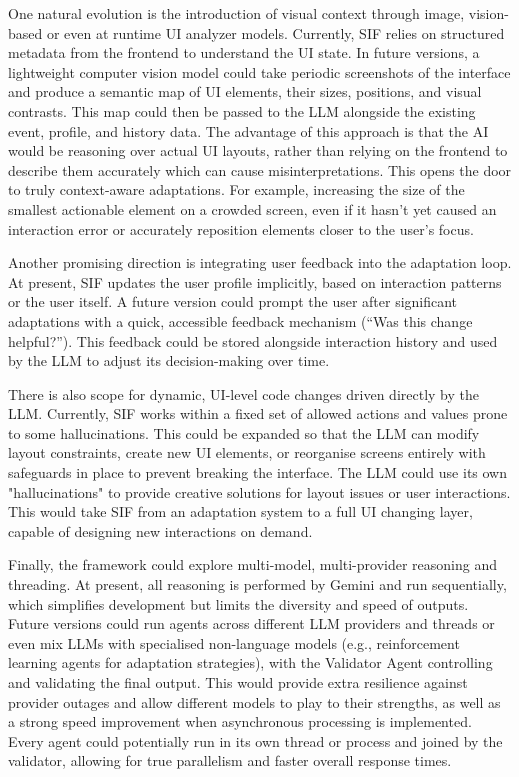 \documentclass[openany]{book}
\begin{document}
One natural evolution is the introduction of visual context through image, vision-based or even at runtime UI analyzer models. Currently, SIF relies on structured metadata from the frontend to understand the UI state. In future versions, a lightweight computer vision model could take periodic screenshots of the interface and produce a semantic map of UI elements, their sizes, positions, and visual contrasts. This map could then be passed to the LLM alongside the existing event, profile, and history data. The advantage of this approach is that the AI would be reasoning over actual UI layouts, rather than relying on the frontend to describe them accurately which can cause misinterpretations. This opens the door to truly context-aware adaptations. For example, increasing the size of the smallest actionable element on a crowded screen, even if it hasn’t yet caused an interaction error or accurately reposition elements closer to the user's focus.

Another promising direction is integrating user feedback into the adaptation loop. At present, SIF updates the user profile implicitly, based on interaction patterns or the user itself. A future version could prompt the user after significant adaptations with a quick, accessible feedback mechanism (“Was this change helpful?”). This feedback could be stored alongside interaction history and used by the LLM to adjust its decision-making over time. 

There is also scope for dynamic, UI-level code changes driven directly by the LLM. Currently, SIF works within a fixed set of allowed actions and values prone to some hallucinations. This could be expanded so that the LLM can modify layout constraints, create new UI elements, or reorganise screens entirely with safeguards in place to prevent breaking the interface. The LLM could use its own "hallucinations" to provide creative solutions for layout issues or user interactions. This would take SIF from an adaptation system to a full UI changing layer, capable of designing new interactions on demand.

Finally, the framework could explore multi-model, multi-provider reasoning and threading. At present, all reasoning is performed by Gemini and run sequentially, which simplifies development but limits the diversity and speed of outputs. Future versions could run agents across different LLM providers and threads or even mix LLMs with specialised non-language models (e.g., reinforcement learning agents for adaptation strategies), with the Validator Agent controlling and validating the final output. This would provide extra resilience against provider outages and allow different models to play to their strengths, as well as a strong speed improvement when asynchronous processing is implemented. Every agent could potentially run in its own thread or process and joined by the validator, allowing for true parallelism and faster overall response times.
\end{document}
